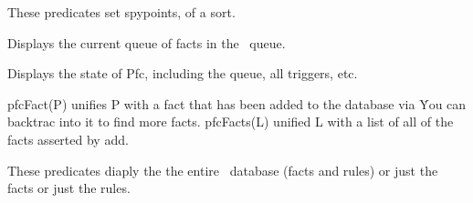 These predicates set spypoints, of a sort.


Displays the current queue of facts in the \pfc\ queue.

 Displays the state of Pfc, including the queue, all
triggers, etc.


pfcFact(P) unifies P with a fact that has been added to the database
via \pfc\.  You can backtrac into it to find more facts.  pfcFacts(L)
unified L with a list of all of the facts asserted by add.


These predicates diaply the the entire \pfc\ database (facts and
rules) or just the facts or just the rules.

